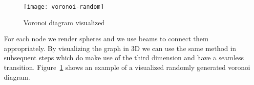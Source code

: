 \begin{figure}[h]
	\centering
	\texttt{[image: voronoi-random]}
	\caption{Voronoi diagram visualized}
	\label{fig:voronoi-random}
\end{figure}

For each node we render spheres and we use beams to connect them appropriately. By visualizing the graph in 3D we can use the same method in subsequent steps which do make use of the third dimension and have a seamless transition. Figure~\ref{fig:voronoi-random} shows an example of a visualized randomly generated voronoi diagram.
